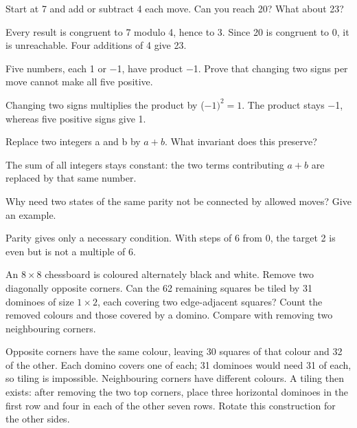 \documentclass[11pt]{article}
\begin{document}
Start at 7 and add or subtract 4 each move. Can you reach 20? What about 23?\par
Every result is congruent to 7 modulo 4, hence to 3. Since 20 is congruent to 0, it is unreachable. Four additions of 4 give 23.\par
{}
Five numbers, each 1 or −1, have product −1. Prove that changing two signs per move cannot make all five positive.\par
Changing two signs multiplies the product by (−\(1)^{2} = 1\). The product stays −1, whereas five positive signs give 1.\par
{}
Replace two integers a and b by \(a + b\). What invariant does this preserve?\par
The sum of all integers stays constant: the two terms contributing \(a + b\) are replaced by that same number.\par
{}
Why need two states of the same parity not be connected by allowed moves? Give an example.\par
Parity gives only a necessary condition. With steps of 6 from 0, the target 2 is even but is not a multiple of 6.\par
{}
An \(8 \times  8\) chessboard is coloured alternately black and white. Remove two diagonally opposite corners. Can the 62 remaining squares be tiled by 31 dominoes of size \(1 \times  2\), each covering two edge-adjacent squares? Count the removed colours and those covered by a domino. Compare with removing two neighbouring corners.\par
Opposite corners have the same colour, leaving 30 squares of that colour and 32 of the other. Each domino covers one of each; 31 dominoes would need 31 of each, so tiling is impossible. Neighbouring corners have different colours. A tiling then exists: after removing the two top corners, place three horizontal dominoes in the first row and four in each of the other seven rows. Rotate this construction for the other sides.\par
\end{document}
